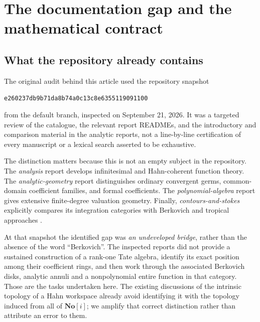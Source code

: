 \documentclass[11pt,a4paper]{article}
\numberwithin{equation}{section}
\theoremstyle{definition}
\theoremstyle{remark}
\newcommand{\No}{\mathbf{No}}
\newcommand{\repocommit}{e260237db9b71da8b74a0c13c8e6355119091100}
\begin{document}
\section{The documentation gap and the mathematical contract}
\label{sec:gap}

\subsection{What the repository already contains}
The original audit behind this article used the repository snapshot
\begin{center}\small\texttt{\repocommit}\end{center}
from the default branch, inspected on September 21, 2026. It was a targeted
review of the catalogue, the relevant report READMEs, and the introductory and
comparison material in the analytic reports, not a line-by-line certification
of every manuscript or a lexical search asserted to be exhaustive.

The distinction matters because this is not an empty subject in the repository.
The \emph{analysis} report develops infinitesimal and Hahn-coherent function
theory. The \emph{analytic-geometry} report distinguishes ordinary convergent
germs, common-domain coefficient families, and formal coefficients. The
\emph{polynomial-algebra} report gives extensive finite-degree valuation
geometry. Finally, \emph{contours-and-stokes} explicitly compares its integration
categories with Berkovich and tropical approaches
\cite{RepoMap,RepoAnalysis,RepoGeometry,RepoPolynomial,RepoContours}.

At that snapshot the identified gap was \emph{an undeveloped bridge}, rather
than the absence of the word ``Berkovich''. The inspected reports did not
provide a sustained construction of a
rank-one Tate algebra, identify its exact position among their coefficient rings,
and then work through the associated Berkovich disks, analytic annuli and a
nonpolynomial entire function in that category. Those are the tasks undertaken
here. The existing discussions of the intrinsic topology of a Hahn workspace
already avoid identifying it with the topology induced from all of $\No[i]$;
we amplify that correct distinction rather than attribute an error to them.
\end{document}
